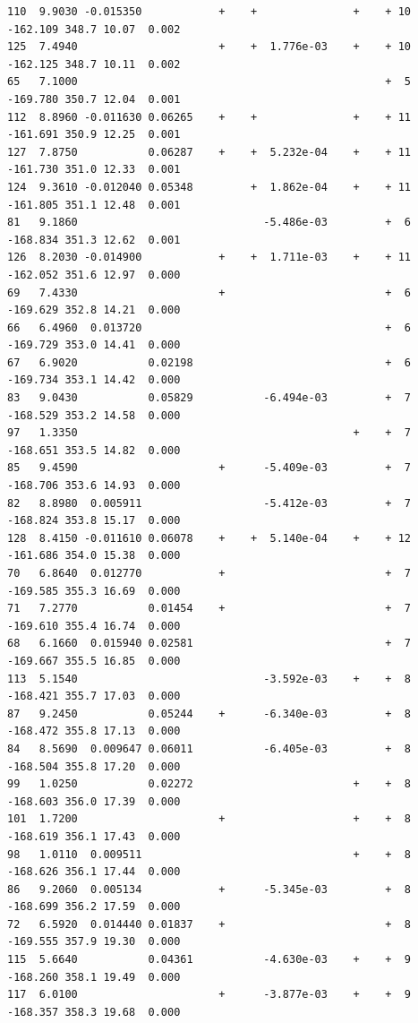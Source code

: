 \documentclass[
  oneside]{krantz}
\begin{document}
\begin{verbatim}
110  9.9030 -0.015350            +    +               +    + 10 -162.109 348.7 10.07  0.002
125  7.4940                      +    +  1.776e-03    +    + 10 -162.125 348.7 10.11  0.002
65   7.1000                                                +  5 -169.780 350.7 12.04  0.001
112  8.8960 -0.011630 0.06265    +    +               +    + 11 -161.691 350.9 12.25  0.001
127  7.8750           0.06287    +    +  5.232e-04    +    + 11 -161.730 351.0 12.33  0.001
124  9.3610 -0.012040 0.05348         +  1.862e-04    +    + 11 -161.805 351.1 12.48  0.001
81   9.1860                             -5.486e-03         +  6 -168.834 351.3 12.62  0.001
126  8.2030 -0.014900            +    +  1.711e-03    +    + 11 -162.052 351.6 12.97  0.000
69   7.4330                      +                         +  6 -169.629 352.8 14.21  0.000
66   6.4960  0.013720                                      +  6 -169.729 353.0 14.41  0.000
67   6.9020           0.02198                              +  6 -169.734 353.1 14.42  0.000
83   9.0430           0.05829           -6.494e-03         +  7 -168.529 353.2 14.58  0.000
97   1.3350                                           +    +  7 -168.651 353.5 14.82  0.000
85   9.4590                      +      -5.409e-03         +  7 -168.706 353.6 14.93  0.000
82   8.8980  0.005911                   -5.412e-03         +  7 -168.824 353.8 15.17  0.000
128  8.4150 -0.011610 0.06078    +    +  5.140e-04    +    + 12 -161.686 354.0 15.38  0.000
70   6.8640  0.012770            +                         +  7 -169.585 355.3 16.69  0.000
71   7.2770           0.01454    +                         +  7 -169.610 355.4 16.74  0.000
68   6.1660  0.015940 0.02581                              +  7 -169.667 355.5 16.85  0.000
113  5.1540                             -3.592e-03    +    +  8 -168.421 355.7 17.03  0.000
87   9.2450           0.05244    +      -6.340e-03         +  8 -168.472 355.8 17.13  0.000
84   8.5690  0.009647 0.06011           -6.405e-03         +  8 -168.504 355.8 17.20  0.000
99   1.0250           0.02272                         +    +  8 -168.603 356.0 17.39  0.000
101  1.7200                      +                    +    +  8 -168.619 356.1 17.43  0.000
98   1.0110  0.009511                                 +    +  8 -168.626 356.1 17.44  0.000
86   9.2060  0.005134            +      -5.345e-03         +  8 -168.699 356.2 17.59  0.000
72   6.5920  0.014440 0.01837    +                         +  8 -169.555 357.9 19.30  0.000
115  5.6640           0.04361           -4.630e-03    +    +  9 -168.260 358.1 19.49  0.000
117  6.0100                      +      -3.877e-03    +    +  9 -168.357 358.3 19.68  0.000

\end{verbatim}
\end{document}

